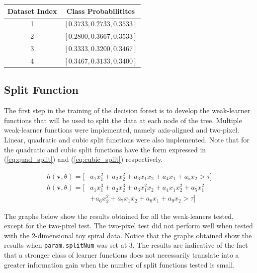 \documentclass[a4paper,pra,twocolumn,10pt,aps,longbibliography,nobalancelastpage]{revtex4-1}
\begin{document}
\begin{table}[H]
\centering
\begin{tabular}{|c|c|}
\hline
Dataset Index & Class Probabilitites 		\\ \hline
1             & $[0.3733, 0.2733, 0.3533]$  	\\ \hline
2             & $[0.2800, 0.3667, 0.3533]$  	\\ \hline
3             & $[0.3333, 0.3200, 0.3467]$ 	\\ \hline
4             & $[0.3467, 0.3133, 0.3400]$  	\\ \hline
\end{tabular}
\end{table}

\subsection{Split Function}

The first step in the training of the decision forest is to develop the weak-learner functions that will be used to split the data at each node of the tree. Multiple weak-learner functions were implemented, namely axis-aligned and two-pixel. Linear, quadratic and cubic split functions were also implemented. Note that for the quadratic and cubic split functions have the form expressed in (\ref{eq:quad_split}) and (\ref{eq:cubic_split}) respectively.

\begin{align}
h(\textbf{v}, \theta) = [&a_1x_1^2+a_2x_2^2+a_3x_1x_2+a_4x_1+a_5x_2>\tau] \label{eq:quad_split} \\
h(\textbf{v}, \theta) = [&a_1x_1^3+a_2x_2^3+a_3x_1^2x_2+a_4x_1x_2^2+a_5x_1^2 \nonumber\\
&+a_6x_2^2+a_7x_1x_2+a_8x_1+a_9x_2>\tau] \label{eq:cubic_split}
\end{align}

The graphs below show the results obtained for all the weak-leaners tested, except for the two-pixel test. The two-pixel test did not perform well when tested with the 2-dimensional toy spiral data. Notice that the graphs obtained show the results when \texttt{param.splitNum} was set at 3. The results are indicative of the fact that a stronger class of learner functions does not necessarily translate into a greater information gain when the number of split functions tested is small.
\end{document}
